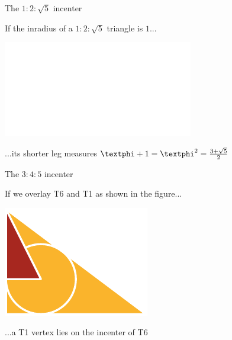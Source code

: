 \documentclass[14pt]{beamer}
\begin{document}

    \begin{frame}{The $1\!\!:\!\!2\!\!:\!\!\sqrt{5}$ incenter}
        \begin{center}
            If the inradius of a $1\!\!:\!\!2\!\!:\!\!\sqrt{5}$ triangle is $1$...

            \bigskip \bigskip

            \includegraphics[height=18ex]{figures/figure006a.pdf}

            \bigskip \bigskip

            ...its shorter leg measures $\text{\textphi}+1 = \text{\textphi}^2 = \frac{3+\sqrt{5}}{2}$
        \end{center}
    \end{frame}


    \begin{frame}{The $3\!\!:\!\!4\!\!:\!\!5$ incenter}
        \begin{center}
            If we overlay T6 and T1 as shown in the figure...

            \bigskip \bigskip

            \includegraphics[height=18ex]{figures/figure006b.pdf}

            \bigskip \bigskip

            ...a T1 vertex lies on the incenter of T6
        \end{center}
    \end{frame}

\end{document}

